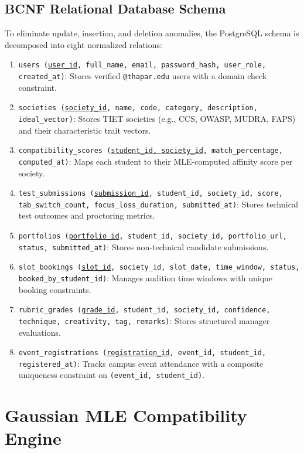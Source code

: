 \documentclass[12pt,a4paper]{report}
\begin{document}
\section{BCNF Relational Database Schema}
To eliminate update, insertion, and deletion anomalies, the PostgreSQL schema is decomposed into eight normalized relations:
\begin{enumerate}[noitemsep]
    \item \texttt{users (\underline{user\_id}, full\_name, email, password\_hash, user\_role, created\_at)}: Stores verified \texttt{@thapar.edu} users with a domain check constraint.
    \item \texttt{societies (\underline{society\_id}, name, code, category, description, ideal\_vector)}: Stores TIET societies (e.g., CCS, OWASP, MUDRA, FAPS) and their characteristic trait vectors.
    \item \texttt{compatibility\_scores (\underline{student\_id, society\_id}, match\_percentage, computed\_at)}: Maps each student to their MLE-computed affinity score per society.
    \item \texttt{test\_submissions (\underline{submission\_id}, student\_id, society\_id, score, tab\_switch\_count, focus\_loss\_duration, submitted\_at)}: Stores technical test outcomes and proctoring metrics.
    \item \texttt{portfolios (\underline{portfolio\_id}, student\_id, society\_id, portfolio\_url, status, submitted\_at)}: Stores non-technical candidate submissions.
    \item \texttt{slot\_bookings (\underline{slot\_id}, society\_id, slot\_date, time\_window, status, booked\_by\_student\_id)}: Manages audition time windows with unique booking constraints.
    \item \texttt{rubric\_grades (\underline{grade\_id}, student\_id, society\_id, confidence, technique, creativity, tag, remarks)}: Stores structured manager evaluations.
    \item \texttt{event\_registrations (\underline{registration\_id}, event\_id, student\_id, registered\_at)}: Tracks campus event attendance with a composite uniqueness constraint on \texttt{(event\_id, student\_id)}.
\end{enumerate}

\chapter{Gaussian MLE Compatibility Engine}
\end{document}
